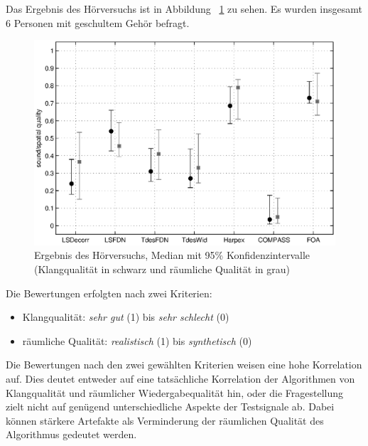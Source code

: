 Das Ergebnis des Hörversuchs ist in Abbildung ~\ref{fig:versuch} zu sehen. Es wurden insgesamt 6 Personen mit geschultem Gehör befragt.

\begin{figure}[!ht]
  \centering
  \includegraphics[width=1\textwidth]{ergebnis/plots/result.eps}
  \caption{Ergebnis des Hörversuchs, Median mit 95\% Konfidenzintervalle (Klangqualität in schwarz und räumliche Qualität in grau)}
  \label{fig:versuch}
\end{figure}

Die Bewertungen erfolgten nach zwei Kriterien:

\begin{itemize}
  \item Klangqualität: \textit{sehr gut} (1) bis \textit{sehr schlecht} (0)
  \item räumliche Qualität: \textit{realistisch} (1) bis \textit{synthetisch} (0)
\end{itemize}

Die Bewertungen nach den zwei gewählten Kriterien weisen eine hohe Korrelation auf. Dies deutet entweder auf eine tatsächliche Korrelation der Algorithmen von Klangqualität und räumlicher Wiedergabequalität hin, oder die Fragestellung zielt nicht auf genügend unterschiedliche Aspekte der Testsignale ab. Dabei können stärkere Artefakte als Verminderung der räumlichen Qualität des Algorithmus gedeutet werden.


